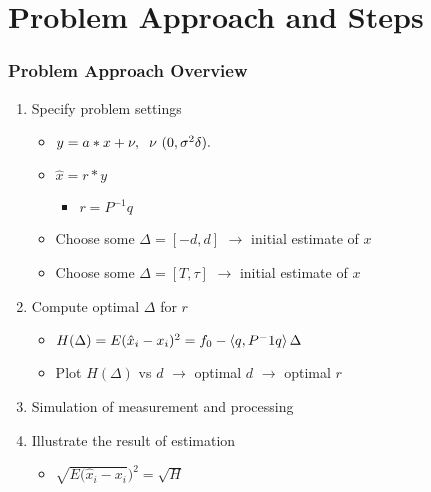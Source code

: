 \documentclass[t]{beamer}
\begin{document}
\section{Problem Approach and Steps} 
\begin{frame}
\frametitle{Problem Approach Overview}
\begin{enumerate}
\item Specify problem settings
\begin{itemize}
\item $y = a*x+\nu, \hspace{.2cm} \nu ~(0,\sigma^2\delta). $
\item $ \hat{x} = r*y$ 
\begin{itemize}
\item $ r = P^{-1}q$ 
\end{itemize}
\item Choose some $\Delta = [-d,d]$  $\rightarrow $ initial estimate of $x$
\item Choose some $\Delta = [T,\tau]$  $\rightarrow $ initial estimate of $x$
\end{itemize}
\item Compute optimal $\Delta$ for $r$
\begin{itemize}
\item $H(\Delta) = E(\hat{x}_{i} - x_{i})^2 = f_{0} - \braket{q,P^-1q}\Delta$
\item Plot $H(\Delta)$ vs $d$ $\rightarrow$ optimal $d$ $\rightarrow$ optimal $r$
\end{itemize}
\item Simulation of measurement and processing
\item Illustrate the result of estimation
\begin{itemize}
\item $\sqrt{E(\hat{x}_{i} - x_{i}})^2 = \sqrt{H}$
\end{itemize}
\end{enumerate}
\end{frame}
\end{document}
